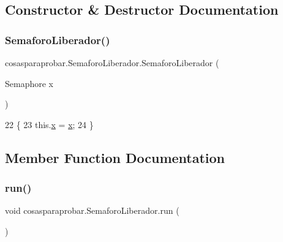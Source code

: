\subsection{Constructor \& Destructor Documentation}
\mbox{\label{classcosasparaprobar_1_1_semaforo_liberador_a4b87cbb393e66de3dcc8727741649b11}} 
\subsubsection{\texorpdfstring{Semaforo\+Liberador()}{SemaforoLiberador()}}
{\footnotesize\ttfamily cosasparaprobar.\+Semaforo\+Liberador.\+Semaforo\+Liberador (\begin{DoxyParamCaption}\item[{Semaphore}]{x }\end{DoxyParamCaption})\hspace{0.3cm}{\ttfamily [inline]}}


\begin{DoxyCode}
22     \{
23         this.\mbox{\hyperlink{classcosasparaprobar_1_1_semaforo_liberador_aa58c46d88298972b9a7ba1c78ff9ab30}{x}} = \mbox{\hyperlink{classcosasparaprobar_1_1_semaforo_liberador_aa58c46d88298972b9a7ba1c78ff9ab30}{x}};
24     \}
\end{DoxyCode}


\subsection{Member Function Documentation}
\mbox{\label{classcosasparaprobar_1_1_semaforo_liberador_a1d5f1711aeb1522013e09fca54f4c4dd}} 
\subsubsection{\texorpdfstring{run()}{run()}}
{\footnotesize\ttfamily void cosasparaprobar.\+Semaforo\+Liberador.\+run (\begin{DoxyParamCaption}{ }\end{DoxyParamCaption})\hspace{0.3cm}{\ttfamily [inline]}}


